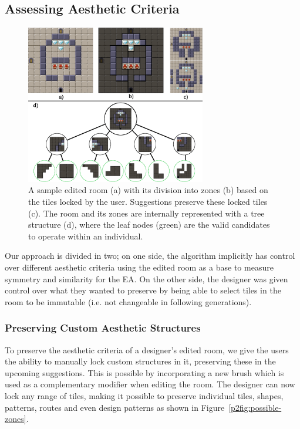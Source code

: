 \subsection{Assessing Aesthetic Criteria} \label{p2approach}

\begin{figure}
\centering
\includegraphics[width=0.7\textwidth]{included-papers-tex/paper-2/pap2-figures/map-representation-figure-test.png}
\caption{A sample edited room (a) with its division into zones (b) based on the tiles locked by the user. Suggestions preserve these locked tiles (c). The room and its zones are internally represented with a tree structure (d), where the leaf nodes (green) are the valid candidates to operate within an individual.}
\label{p2fig:map-representation}
\end{figure}

Our approach is divided in two; on one side, the algorithm implicitly has control over different aesthetic criteria using the edited room as a base to measure symmetry and similarity for the EA. On the other side, the designer was given control over what they wanted to preserve by being able to select tiles in the room to be immutable (i.e. not changeable in following generations).

\subsubsection{Preserving Custom Aesthetic Structures}

To preserve the aesthetic criteria of a designer's edited room, we give the users the ability to manually lock custom structures in it, preserving these in the upcoming suggestions. This is possible by incorporating a new brush which is used as a complementary modifier when editing the room. The designer can now lock any range of tiles, making it possible to preserve individual tiles, shapes, patterns, routes and even design patterns as shown in Figure~\ref{p2fig:possible-zones}.

